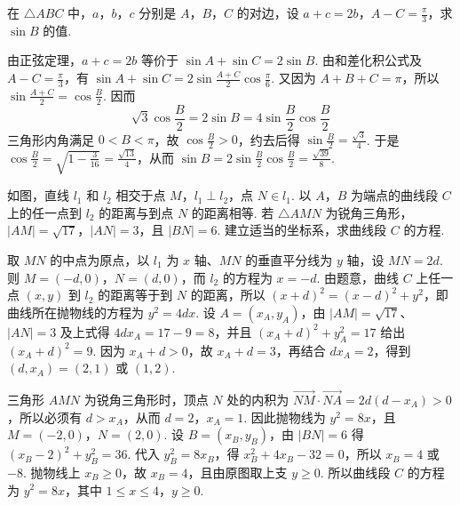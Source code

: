 \begin{problem}
在 \(\triangle ABC\) 中，\(a\)，\(b\)，\(c\) 分别是 \(A\)，\(B\)，\(C\) 的对边，设 \(a + c = 2b\)，\(A - C = \frac{\pi}{3}\)，求 \(\sin B\) 的值.
\end{problem}

\begin{solution}
由正弦定理，\(a+c=2b\) 等价于 \(\sin A+\sin C=2\sin B\). 由和差化积公式及 \(A-C=\frac{\pi}{3}\)，有 \(\sin A+\sin C=2\sin\frac{A+C}{2}\cos\frac{\pi}{6}\). 又因为 \(A+B+C=\pi\)，所以 \(\sin\frac{A+C}{2}=\cos\frac{B}{2}\). 因而
\[
\sqrt{3}\cos\frac{B}{2}=2\sin B=4\sin\frac{B}{2}\cos\frac{B}{2}
\]
三角形内角满足 \(0<B<\pi\)，故 \(\cos\frac{B}{2}>0\)，约去后得 \(\sin\frac{B}{2}=\frac{\sqrt{3}}{4}\). 于是 \(\cos\frac{B}{2}=\sqrt{1-\frac{3}{16}}=\frac{\sqrt{13}}{4}\)，从而 \(\sin B=2\sin\frac{B}{2}\cos\frac{B}{2}=\frac{\sqrt{39}}{8}\).
\end{solution}

\begin{problem}
如图，直线 \(l_{1}\) 和 \(l_{2}\) 相交于点 \(M\)，\(l_{1} \perp l_{2}\)，点 \(N \in l_{1}\). 以 \(A\)，\(B\) 为端点的曲线段 \(C\) 上的任一点到 \(l_{2}\) 的距离与到点 \(N\) 的距离相等. 若 \(\triangle AMN\) 为锐角三角形，\(|AM| = \sqrt{17}\)，\(|AN| = 3\)，且 \(|BN| = 6\). 建立适当的坐标系，求曲线段 \(C\) 的方程.

\end{problem}

\begin{solution}
取 \(MN\) 的中点为原点，以 \(l_1\) 为 \(x\) 轴、\(MN\) 的垂直平分线为 \(y\) 轴，设 \(MN=2d\). 则 \(M=(-d,0)\)，\(N=(d,0)\)，而 \(l_2\) 的方程为 \(x=-d\). 由题意，曲线 \(C\) 上任一点 \((x,y)\) 到 \(l_2\) 的距离等于到 \(N\) 的距离，所以 \((x+d)^2=(x-d)^2+y^2\)，即曲线所在抛物线的方程为 \(y^2=4dx\). 设 \(A=(x_A,y_A)\)，由 \(|AM|=\sqrt{17}\)、\(|AN|=3\) 及上式得 \(4dx_A=17-9=8\)，并且 \((x_A+d)^2+y_A^2=17\) 给出 \((x_A+d)^2=9\). 因为 \(x_A+d>0\)，故 \(x_A+d=3\)，再结合 \(dx_A=2\)，得到 \((d,x_A)=(2,1)\) 或 \((1,2)\).

三角形 \(AMN\) 为锐角三角形时，顶点 \(N\) 处的内积为 \(\overrightarrow{NM}\cdot\overrightarrow{NA}=2d(d-x_A)>0\)，所以必须有 \(d>x_A\)，从而 \(d=2\)，\(x_A=1\). 因此抛物线为 \(y^2=8x\)，且 \(M=(-2,0)\)，\(N=(2,0)\). 设 \(B=(x_B,y_B)\)，由 \(|BN|=6\) 得 \((x_B-2)^2+y_B^2=36\). 代入 \(y_B^2=8x_B\)，得 \(x_B^2+4x_B-32=0\)，所以 \(x_B=4\) 或 \(-8\). 抛物线上 \(x_B\geqslant0\)，故 \(x_B=4\)，且由原图取上支 \(y\geqslant0\). 所以曲线段 \(C\) 的方程为 \(y^2=8x\)，其中 \(1\leqslant x\leqslant4\)，\(y\geqslant0\).
\end{solution}

